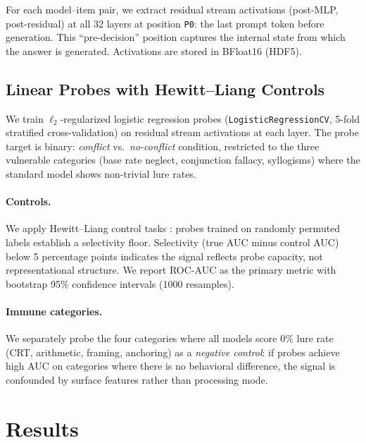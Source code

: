 \documentclass[accepted]{article}
\newcommand{\pzero}{\texttt{P0}}
\begin{document}
For each model--item pair, we extract residual stream activations
(post-MLP, post-residual) at all 32 layers at position \pzero{}: the
last prompt token before generation.  This ``pre-decision'' position
captures the internal state from which the answer is generated.
Activations are stored in BFloat16 (HDF5).

\subsection{Linear Probes with Hewitt--Liang Controls}
\label{sec:probes}

We train $\ell_2$-regularized logistic regression probes
(\texttt{LogisticRegressionCV}, 5-fold stratified cross-validation) on
residual stream activations at each layer.  The probe target is binary:
\emph{conflict} vs.\ \emph{no-conflict} condition, restricted to the three
vulnerable categories (base rate neglect, conjunction fallacy, syllogisms)
where the standard model shows non-trivial lure rates.

\paragraph{Controls.}  We apply Hewitt--Liang control tasks
\citep{hewitt2019control}: probes trained on randomly permuted labels
establish a selectivity floor.  Selectivity (true AUC minus control AUC)
below 5 percentage points indicates the signal reflects probe capacity,
not representational structure.  We report ROC-AUC as the primary metric
with bootstrap 95\% confidence intervals (1000 resamples).

\paragraph{Immune categories.}  We separately probe the four categories
where all models score 0\% lure rate (CRT, arithmetic, framing,
anchoring) as a \emph{negative control}: if probes achieve high AUC on
categories where there is no behavioral difference, the signal is
confounded by surface features rather than processing mode.


\section{Results}
\label{sec:results}
\end{document}
